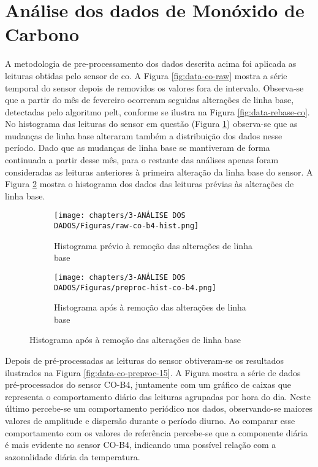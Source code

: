 \section{Análise dos dados de Monóxido de Carbono}

A metodologia de pre-processamento dos dados descrita acima foi aplicada as leituras obtidas pelo sensor de \acrshort{co}. A Figura \ref{fig:data-co-raw} mostra a série temporal do sensor depois de removidos os valores fora de intervalo. Observa-se que a partir do mês de fevereiro ocorreram seguidas alterações de linha base, detectadas pelo algoritmo \acrshort{pelt}, conforme se ilustra na Figura \ref{fig:data-rebase-co}. No histograma das leituras do sensor em questão (Figura \ref{fig:data-co-raw-hist}) observa-se que as mudanças de linha base alteraram também a distribuição dos dados nesse período. Dado que as mudanças de linha base se mantiveram de forma continuada a partir desse mês, para o restante das análises apenas foram consideradas as leituras anteriores à primeira alteração da linha base do sensor. A Figura \ref{fig:data-co-preproc-hist} mostra o histograma dos dados das leituras prévias às alterações de linha base.

\begin{figure}[h]
    \centering
    \caption{Histograma das leituras do sensor CO-B4}
    \begin{subfigure}{0.4\textwidth}
        \texttt{[image: chapters/3-ANÁLISE DOS DADOS/Figuras/raw-co-b4-hist.png]}
        \caption{Histograma prévio à remoção das alterações de linha base}
        \label{fig:data-co-raw-hist}
    \end{subfigure}
    \hfill
    \begin{subfigure}{0.4\textwidth}
        \texttt{[image: chapters/3-ANÁLISE DOS DADOS/Figuras/preproc-hist-co-b4.png]}
        \caption{Histograma após à remoção das alterações de linha base}
        \label{fig:data-co-preproc-hist}
    \end{subfigure}
    \hfill
    \label{fig:data-co-hist}
\end{figure}

Depois de pré-processadas as leituras do sensor obtiveram-se os resultados ilustrados na Figura \ref{fig:data-co-preproc-15}. A Figura mostra a série de dados pré-processados do sensor CO-B4, juntamente com um gráfico de caixas que representa o comportamento diário das leituras agrupadas por hora do dia. Neste último percebe-se um comportamento periódico nos dados, observando-se maiores valores de amplitude e dispersão durante o período diurno. Ao comparar esse comportamento com os valores de referência percebe-se que a componente diária é mais evidente no sensor CO-B4, indicando uma possível relação com a sazonalidade diária da temperatura.

